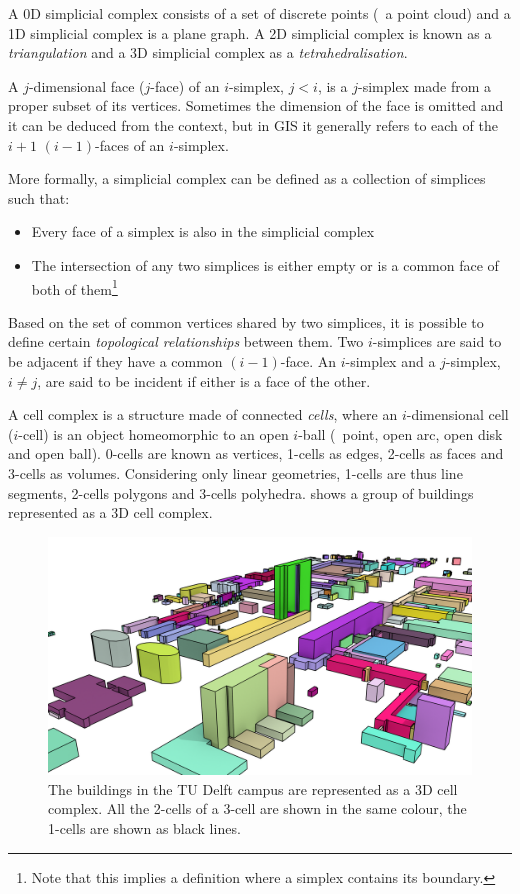 A 0D simplicial complex consists of a set of discrete points (\ie\ a point cloud) and a 1D simplicial complex is a plane graph.
A 2D simplicial complex is known as a \emph{triangulation} and a 3D simplicial complex as a \emph{tetrahedralisation}.

A $j$-dimensional face ($j$-face) of an $i$-simplex, $j < i$, is a $j$-simplex made from a proper subset of its vertices.
Sometimes the dimension of the face is omitted and it can be deduced from the context, but in GIS it generally refers to each of the $i+1$ $(i-1)$-faces of an $i$-simplex.

More formally, a simplicial complex can be defined as a collection of simplices such that:
\begin{itemize}
\item
Every face of a simplex is also in the simplicial complex
\item
The intersection of any two simplices is either empty or is a common face of both of them\footnote{Note that this implies a definition where a simplex contains its boundary.}
\end{itemize}

Based on the set of common vertices shared by two simplices, it is possible to define certain \emph{topological relationships} between them.
Two $i$-simplices are said to be adjacent if they have a common $(i-1)$-face.
An $i$-simplex and a $j$-simplex, $i \neq j$, are said to be incident if either is a face of the other.

A cell complex is a structure made of connected \emph{cells}, where an $i$-dimensional cell ($i$-cell) is an object homeomorphic to an open $i$-ball (\ie\ point, open arc, open disk and open ball).
0-cells are known as vertices, 1-cells as edges, 2-cells as faces and 3-cells as volumes.
Considering only linear geometries, 1-cells are thus line segments, 2-cells polygons and 3-cells polyhedra.
 shows a group of buildings represented as a 3D cell complex.
\begin{figure}[tbp]
\centering
\includegraphics[width=\linewidth]{figs/cellscampus}
\caption[The TU Delft campus as a 3D cell complex]{The buildings in the TU Delft campus are represented as a 3D cell complex. All the 2-cells of a 3-cell are shown in the same colour, the 1-cells are shown as black lines.}
\label{fig:cellscampus}
\end{figure}

